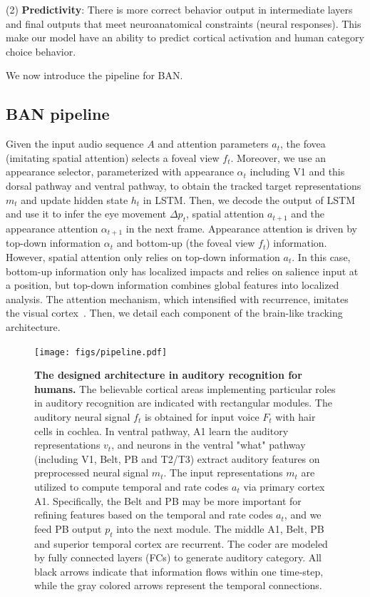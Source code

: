 \documentclass[journal]{IEEEtran}
\begin{document}
(2) \textbf{Predictivity}: 
There is more correct behavior output in intermediate layers and final outputs that meet neuroanatomical constraints (neural responses). 
This make our model have an ability to predict cortical activation and human category choice behavior.

We now introduce the pipeline for BAN. 


\subsection{BAN pipeline} \label{sec:cornet_s_def}

Given the input audio sequence $A$ and attention parameters $a_t$, the fovea (imitating spatial attention) selects a foveal view $f_t$. 
Moreover, we use an appearance selector, parameterized with appearance $\alpha _t$ including V1 and this dorsal pathway and ventral pathway, to obtain the tracked target representations $m_t$ 
and update hidden state $h_t$ in LSTM.
Then, we decode the output of LSTM and use it to infer the eye movement $\Delta p_t$, spatial attention $a_{t+1}$ and the appearance attention $\alpha _{t+1}$ in the next frame.  
Appearance attention is driven by top-down information $\alpha _t$ and bottom-up (the foveal view $f_t$) information. 
However, spatial attention only relies on top-down information $a_t$.
In this case, bottom-up information only has localized impacts and relies on salience input at a position, 
but top-down information combines global features into localized analysis. 
The attention mechanism, which intensified with recurrence, imitates the visual cortex~\cite{attention}.
Then, we detail each component of the brain-like tracking architecture. 


\begin{figure}
	\centering
	\texttt{[image: figs/pipeline.pdf]}
	\caption{
	\textbf{
	The designed architecture in auditory recognition for humans.}
	The believable cortical areas implementing particular roles in auditory recognition are indicated with rectangular modules.
	The auditory neural signal $f_t$ is obtained for input voice $F_t$ with hair cells in cochlea. 
	In ventral pathway, A1 learn the auditory representations $v_t$, 
	and neurons in the ventral "what" pathway (including V1, Belt, PB and T2/T3) extract auditory features on preprocessed neural signal $m_t$.
	The input representations $m_t$ are utilized to compute temporal and rate codes $a_t$ via primary cortex A1.
	Specifically, the Belt and PB may be more important for refining features based on the temporal and rate codes $a_t$,
	and we feed PB output $p_t$ into the next module. 
	The middle A1, Belt, PB and superior temporal cortex are recurrent.
	The coder are modeled by fully connected layers (FCs) to generate auditory category.
	All black arrows indicate that information flows within one time-step, 
	while the gray colored arrows represent the temporal connections.
	}
	\label{fig:pipeline}
\end{figure}
\end{document}
